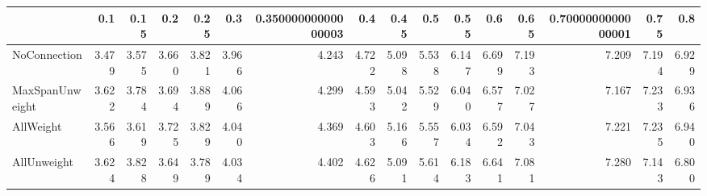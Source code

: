 \begin{tabular}{lrrrrrrrrrrrrrrr}
\toprule
{} &   0.1 &  0.15 &   0.2 &  0.25 &   0.3 & 0.35000000000000003 &   0.4 &  0.45 &   0.5 &  0.55 &   0.6 &  0.65 & 0.7000000000000001 &  0.75 &   0.8 \\
\midrule
NoConnection    & 3.479 & 3.575 & 3.660 & 3.821 & 3.966 &               4.243 & 4.722 & 5.098 & 5.538 & 6.147 & 6.699 & 7.193 &              7.209 & 7.194 & 6.929 \\
MaxSpanUnweight & 3.622 & 3.784 & 3.694 & 3.889 & 4.066 &               4.299 & 4.593 & 5.042 & 5.529 & 6.040 & 6.577 & 7.027 &              7.167 & 7.233 & 6.936 \\
AllWeight       & 3.566 & 3.619 & 3.725 & 3.829 & 4.040 &               4.369 & 4.603 & 5.166 & 5.557 & 6.034 & 6.592 & 7.043 &              7.221 & 7.235 & 6.940 \\
AllUnweight     & 3.624 & 3.828 & 3.649 & 3.789 & 4.034 &               4.402 & 4.626 & 5.091 & 5.614 & 6.183 & 6.641 & 7.081 &              7.280 & 7.143 & 6.800 \\
\bottomrule
\end{tabular}
